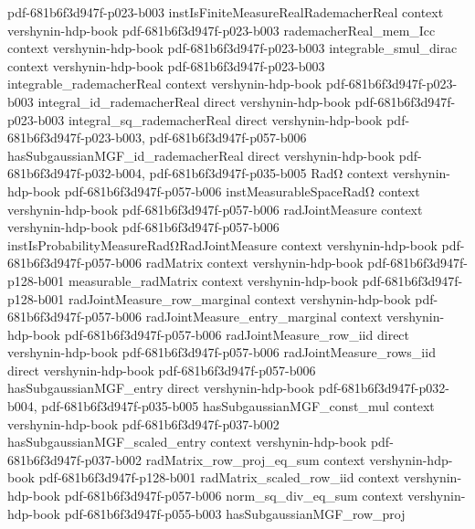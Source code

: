 \begin{theorem}
  {pdf-681b6f3d947f-p023-b003}
\proofstep
  {instIsFiniteMeasureRealRademacherReal}
  {context}
  {vershynin-hdp-book}
  {pdf-681b6f3d947f-p023-b003}
\proofstep
  {rademacherReal_mem_Icc}
  {context}
  {vershynin-hdp-book}
  {pdf-681b6f3d947f-p023-b003}
\proofstep
  {integrable_smul_dirac}
  {context}
  {vershynin-hdp-book}
  {pdf-681b6f3d947f-p023-b003}
\proofstep
  {integrable_rademacherReal}
  {context}
  {vershynin-hdp-book}
  {pdf-681b6f3d947f-p023-b003}
\proofstep
  {integral_id_rademacherReal}
  {direct}
  {vershynin-hdp-book}
  {pdf-681b6f3d947f-p023-b003}
\proofstep
  {integral_sq_rademacherReal}
  {direct}
  {vershynin-hdp-book}
  {pdf-681b6f3d947f-p023-b003,
    pdf-681b6f3d947f-p057-b006}
\proofstep
  {hasSubgaussianMGF_id_rademacherReal}
  {direct}
  {vershynin-hdp-book}
  {pdf-681b6f3d947f-p032-b004,
    pdf-681b6f3d947f-p035-b005}
\proofstep
  {RadΩ}
  {context}
  {vershynin-hdp-book}
  {pdf-681b6f3d947f-p057-b006}
\proofstep
  {instMeasurableSpaceRadΩ}
  {context}
  {vershynin-hdp-book}
  {pdf-681b6f3d947f-p057-b006}
\proofstep
  {radJointMeasure}
  {context}
  {vershynin-hdp-book}
  {pdf-681b6f3d947f-p057-b006}
\proofstep
  {instIsProbabilityMeasureRadΩRadJointMeasure}
  {context}
  {vershynin-hdp-book}
  {pdf-681b6f3d947f-p057-b006}
\proofstep
  {radMatrix}
  {context}
  {vershynin-hdp-book}
  {pdf-681b6f3d947f-p128-b001}
\proofstep
  {measurable_radMatrix}
  {context}
  {vershynin-hdp-book}
  {pdf-681b6f3d947f-p128-b001}
\proofstep
  {radJointMeasure_row_marginal}
  {context}
  {vershynin-hdp-book}
  {pdf-681b6f3d947f-p057-b006}
\proofstep
  {radJointMeasure_entry_marginal}
  {context}
  {vershynin-hdp-book}
  {pdf-681b6f3d947f-p057-b006}
\proofstep
  {radJointMeasure_row_iid}
  {direct}
  {vershynin-hdp-book}
  {pdf-681b6f3d947f-p057-b006}
\proofstep
  {radJointMeasure_rows_iid}
  {direct}
  {vershynin-hdp-book}
  {pdf-681b6f3d947f-p057-b006}
\proofstep
  {hasSubgaussianMGF_entry}
  {direct}
  {vershynin-hdp-book}
  {pdf-681b6f3d947f-p032-b004,
    pdf-681b6f3d947f-p035-b005}
\proofstep
  {hasSubgaussianMGF_const_mul}
  {context}
  {vershynin-hdp-book}
  {pdf-681b6f3d947f-p037-b002}
\proofstep
  {hasSubgaussianMGF_scaled_entry}
  {context}
  {vershynin-hdp-book}
  {pdf-681b6f3d947f-p037-b002}
\proofstep
  {radMatrix_row_proj_eq_sum}
  {context}
  {vershynin-hdp-book}
  {pdf-681b6f3d947f-p128-b001}
\proofstep
  {radMatrix_scaled_row_iid}
  {context}
  {vershynin-hdp-book}
  {pdf-681b6f3d947f-p057-b006}
\proofstep
  {norm_sq_div_eq_sum}
  {context}
  {vershynin-hdp-book}
  {pdf-681b6f3d947f-p055-b003}
\proofstep
  {hasSubgaussianMGF_row_proj}

\end{theorem}
